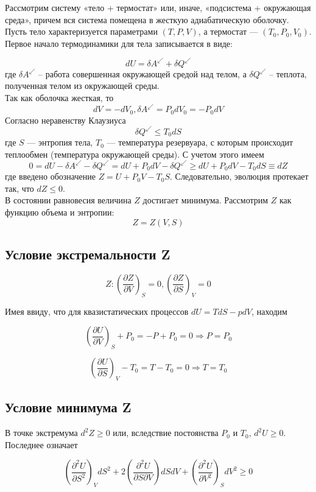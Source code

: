 \documentclass[a4paper,14pt]{article} %
\begin{document}
Рассмотрим систему «тело + термостат» или, иначе, «подсистема + окружающая среда», причем вся система помещена в жесткую адиабатическую оболочку. Пусть тело характеризуется параметрами $(T, P, V)$, а
термостат — $(T_0, P_0, V_0)$. Первое начало термодинамики для тела записывается в виде:

\[dU = \delta A^\swarrow  + \delta Q^\swarrow \]
где $\delta A^\swarrow$ -- работа совершенная окружающей средой над телом, а $\delta Q^\swarrow$ -- теплота, полученная телом из окружающей среды. \\
Так как оболочка жесткая, то
\[dV  = -dV_0, \delta A^ \swarrow = P_0 dV_0 = -P_0 dV\]
Согласно неравенству Клаузиуса
\[\delta Q^\swarrow \leq T_0 dS\]
где $S$ — энтропия тела, $T_0$ — температура резервуара, с которым происходит теплообмен (температура окружающей среды). С учетом
этого имеем
\[0 = dU - \delta A^\swarrow - \delta Q ^ \swarrow = dU + P_0 dV - \delta Q ^ \swarrow \geq dU + P_0dV - T_0 dS \equiv dZ\]
где введено обозначение $Z = U + P_0V - T_0 S$. Следовательно, эволюция
протекает так, что $dZ \leq 0$.\\
В состоянии равновесия величина $Z$ достигает минимума. Рассмотрим
$Z$ как функцию объема и энтропии:
\[Z = Z (V,S)\]

\subsection{Условие экстремальности Z}
\[Z: \left(\frac{\partial Z}{\partial V}\right)_S = 0, \left(\frac{\partial Z}{\partial S}\right)_V = 0\]

Имея ввиду, что для квазистатических процессов $dU = T dS - p dV$, находим

\[\left(\frac{\partial U}{\partial V}\right)_S + P_0 = -P + P_0 = 0 \Rightarrow P = P_0\]

\[\left(\frac{\partial U}{\partial S}\right)_V - T_0 = T - T_0 = 0 \Rightarrow T = T_0\]

\subsection{Условие минимума Z}
В точке экстремума $d^2Z \geq 0$ или, вследствие
постоянства $P_0$ и $T_0$, $d^2 U \geq 0$. Последнее означает

\begin{equation}
	\left(\frac{\partial^2 U}{\partial S^2}\right)_V dS^2 + 2 \left(\frac{\partial^2 U}{\partial S \partial V}\right) dS dV + \left(\frac{\partial^2 U}{\partial V^2}\right)_S dV^2 \geq 0
	\label{1.5.1}
\end{equation}
\end{document}
